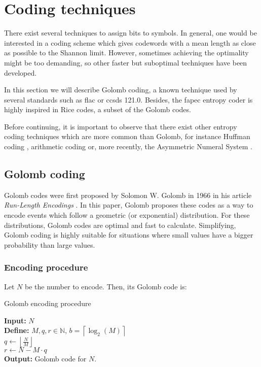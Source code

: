 \section{Coding techniques}
There exist several techniques to assign bits to symbols. In general, one would be interested in a coding scheme which gives codewords with a mean length as close as possible to the Shannon limit. However, sometimes achieving the optimality might be too demanding, so other faster but suboptimal techniques have been developed.

In this section we will describe Golomb coding, a known technique used by several standards such as \acrshort{flac} or \acrshort{ccsds} 121.0. Besides, the \acrshort{fapec} entropy coder is highly inspired in Rice codes, a subset of the Golomb codes.

Before continuing, it is important to observe that there exist other entropy coding techniques which are more common than Golomb, for instance Huffman coding \parencite{cover}, arithmetic coding \parencite{MacKay} or, more recently, the Asymmetric Numeral System \parencite{ans}.

\subsection{Golomb coding} \label{golomb-coding}
Golomb codes were first proposed by Solomon W. Golomb in 1966 in his article \textit{Run-Length Encodings} \parencite{Golomb1966}. In this paper, Golomb proposes these codes as a way to encode events which follow a geometric (or exponential) distribution. For these distributions, Golomb codes are optimal \parencite{OptimalRice} \parencite{OptimalGeometric} and fast to calculate. Simplifying, Golomb coding is highly suitable for situations where small values have a bigger probability than large values.

\subsubsection{Encoding procedure}
Let $N$ be the number to encode. Then, its Golomb code is:

\begin{algorithm}[H]
	\caption{Golomb encoding procedure}
	\SetAlgoLined
	\textbf{Input:} $N$\\
	\textbf{Define:} $M,q,r \in \mathbb{N}$, \quad $b = \left\lceil \log_2(M) \right\rceil$\\
	$q \gets \left\lfloor \frac{N}{M} \right\rfloor$\\
	$r \gets N - M \cdot q$\\
	\textbf{Output:} Golomb code for $N$.
\end{algorithm}

